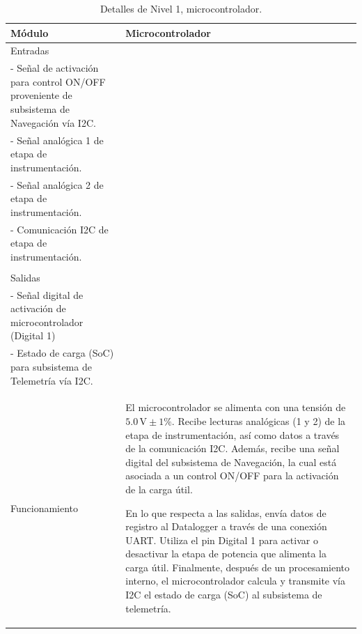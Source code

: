 \begin{table}[h!]
    \centering
    \caption{Detalles de Nivel 1, microcontrolador.}
    \label{tab:nivel1_Microcontrolador}
    \begin{tabular}{ll}
    \toprule
        Módulo  & Microcontrolador\\ 
    \midrule
        Entradas & 
        \begin{minipage}[t]{0.75\linewidth}
 - Alimentación $5.0 \, \text{V} \pm 1\%$\\
 - Señal de activación para control ON/OFF proveniente de subsistema de Navegación vía I2C.\\
- Señal analógica 1 de etapa de instrumentación.\\
- Señal analógica 2 de etapa de instrumentación.\\
- Comunicación I2C de etapa de instrumentación.\\
 
        \end{minipage} \\
    \midrule
        Salidas & 
        \begin{minipage}[t]{0.75\linewidth}
    - Comunicación UART con Datalogger.\\
    - Señal digital de activación de microcontrolador (Digital 1)\\
    - Estado de carga (SoC) para subsistema de Telemetría vía I2C.

        \end{minipage} \\
    \midrule
        Funcionamiento & 
        \begin{minipage}[t]{0.75\linewidth}
El microcontrolador se alimenta con una tensión de $5.0 \, \text{V} \pm 1\%$. Recibe lecturas analógicas (1 y 2) de la etapa de instrumentación, así como datos a través de la comunicación I2C. Además, recibe una señal digital del subsistema de Navegación, la cual está asociada a un control ON/OFF para la activación de la carga útil.

En lo que respecta a las salidas, envía datos de registro al Datalogger a través de una conexión UART. Utiliza el pin Digital 1 para activar o desactivar la etapa de potencia que alimenta la carga útil. Finalmente, después de un procesamiento interno, el microcontrolador calcula y transmite vía I2C el estado de carga (SoC) al subsistema de telemetría.


        \end{minipage} \\
    \bottomrule
    \end{tabular}
\end{table}

